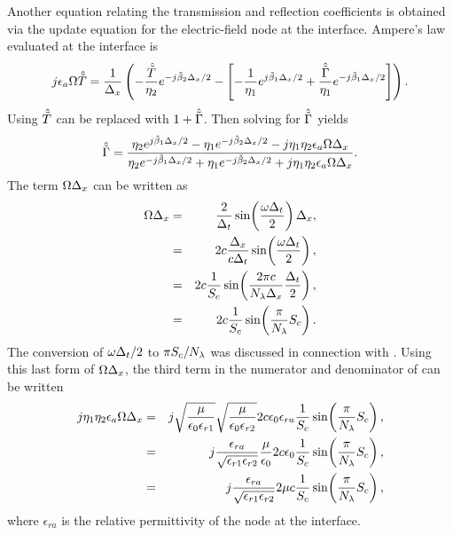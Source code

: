 Another equation relating the transmission and reflection coefficients
is obtained via the update equation for the electric-field node at the
interface.  Ampere's law evaluated at the interface is
\begin{equation}
  j\epsilon_a\Omega \hat{\tilde{T}} = \frac{1}{\Delta_x}
  \left(-\frac{\hat{\tilde{T}}}{\eta_2} e^{-j\tilde{\beta}_2\Delta_x/2} -
  \left[-\frac{1}{\eta_1} e^{j\tilde{\beta}_1\Delta_x/2} +
         \frac{\hat{\tilde{\Gamma}}}{\eta_1} e^{-j\tilde{\beta}_1\Delta_x/2}\right]
  \right).
\end{equation}
Using  $\hat{\tilde{T}}$ can be replaced with
$1+\hat{\tilde{\Gamma}}$.  Then solving for $\hat{\tilde{\Gamma}}$ yields
\begin{equation}
  \hat{\tilde{\Gamma}} = \frac{\eta_2 e^{j\tilde{\beta}_1\Delta_x/2} - 
                 \eta_1 e^{-j\tilde{\beta}_2\Delta_x/2} - 
                 j\eta_1\eta_2\epsilon_a\Omega\Delta_x}
                {\eta_2 e^{-j\tilde{\beta}_1\Delta_x/2} +
                 \eta_1 e^{-j\tilde{\beta}_2\Delta_x/2} + 
                 j\eta_1\eta_2\epsilon_a\Omega\Delta_x}.
  \label{eq:gammaAverage}
\end{equation}
The term $\Omega\Delta_x$ can be written as
\begin{eqnarray}
  \Omega\Delta_x &=& \frac{2}{\Delta_t}
      \sin\!\left(\frac{\omega\Delta_t}{2}\right)\Delta_x, \\
  &=& 2c\frac{\Delta_x}{c\Delta_t}
      \sin\!\left(\frac{\omega\Delta_t}{2}\right), \\
  &=& 2c\frac{1}{S_c}
      \sin\!\left(\frac{2\pi c}{N_\lambda\Delta_x}\frac{\Delta_t}{2}\right), \\
  &=& 2c\frac{1}{S_c}
      \sin\!\left(\frac{\pi}{N_\lambda} S_c\right).
\end{eqnarray}
The conversion of $\omega\Delta_t/2$ to $\pi S_c/N_\lambda$ was discussed in
connection with .  Using this last form of
$\Omega\Delta_x$, the third term in the numerator and denominator of
 can be written
\begin{eqnarray}
  j\eta_1\eta_2\epsilon_a\Omega\Delta_x &=&
  j\sqrt{\frac{\mu}{\epsilon_0\epsilon_{r1}}}
   \sqrt{\frac{\mu}{\epsilon_0\epsilon_{r2}}}
  2c\epsilon_0\epsilon_{ra}\frac{1}{S_c}
      \sin\!\left(\frac{\pi}{N_\lambda} S_c\right), \\
  &=&
  j\frac{\epsilon_{ra}}{\sqrt{\epsilon_{r1}\epsilon_{r2}}}
   \frac{\mu}{\epsilon_0}
  2c\epsilon_0\frac{1}{S_c}
      \sin\!\left(\frac{\pi}{N_\lambda} S_c\right), \\
  &=&
  j\frac{\epsilon_{ra}}{\sqrt{\epsilon_{r1}\epsilon_{r2}}}
  2\mu c \frac{1}{S_c}
      \sin\!\left(\frac{\pi}{N_\lambda} S_c\right),
  \label{eq:interfaceTerm}
\end{eqnarray}
where $\epsilon_{ra}$ is the relative permittivity of the node at the
interface.


